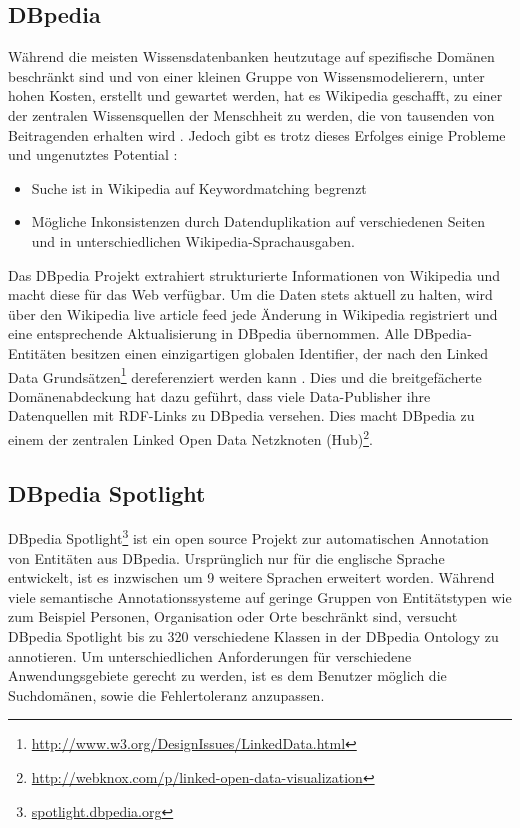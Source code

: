 \documentclass[11pt, a4paper, oneside]{Thesis} %
\begin{document}
\subsection{DBpedia}
W\"ahrend die meisten Wissensdatenbanken heutzutage auf spezifische Dom\"anen beschr\"ankt sind und von einer kleinen Gruppe von Wissensmodelierern, unter hohen Kosten, erstellt und gewartet werden, hat es Wikipedia geschafft, zu einer der zentralen Wissensquellen der Menschheit zu werden, die von tausenden von Beitragenden erhalten wird \citep{chr09}. Jedoch gibt es trotz dieses Erfolges einige Probleme und ungenutztes Potential \citep{moha12}:
\begin{itemize}
\item Suche ist in Wikipedia auf Keywordmatching begrenzt
\item M\"ogliche Inkonsistenzen durch Datenduplikation auf verschiedenen Seiten und in unterschiedlichen Wikipedia-Sprachausgaben.
\end{itemize}
Das DBpedia Projekt extrahiert strukturierte Informationen von Wikipedia und macht diese f\"ur das Web verf\"ugbar. Um die Daten stets aktuell zu halten, wird \"uber den \grqq Wikipedia live article feed\grqq{} jede \"Anderung in Wikipedia registriert und eine entsprechende Aktualisierung in DBpedia \"ubernommen. Alle DBpedia-Entit\"aten besitzen einen einzigartigen globalen Identifier, der nach den Linked Data Grunds\"atzen\footnote{\url{http://www.w3.org/DesignIssues/LinkedData.html}} dereferenziert werden kann \citep{chr09}. Dies und die breitgef\"acherte Dom\"anenabdeckung hat dazu gef\"uhrt, dass viele Data-Publisher ihre Datenquellen mit RDF-Links zu DBpedia versehen. Dies macht DBpedia zu einem der zentralen Linked Open Data Netzknoten (Hub)\footnote{\url{http://webknox.com/p/linked-open-data-visualization}}.

\subsection{DBpedia Spotlight}
DBpedia Spotlight\footnote{\url{spotlight.dbpedia.org}} ist ein open source Projekt zur automatischen Annotation von Entit\"aten aus DBpedia\citep{joch13}. Urspr\"unglich nur f\"ur die englische Sprache entwickelt, ist es inzwischen um 9 weitere Sprachen erweitert worden. W\"ahrend viele semantische Annotationssysteme auf geringe Gruppen von Entit\"atstypen wie zum Beispiel Personen, Organisation oder Orte beschr\"ankt sind, versucht DBpedia Spotlight bis zu 320 verschiedene Klassen in der DBpedia Ontology zu annotieren\citep{mend11}. Um unterschiedlichen Anforderungen f\"ur verschiedene Anwendungsgebiete gerecht zu werden, ist es dem Benutzer m\"oglich die Suchdom\"anen, sowie die Fehlertoleranz anzupassen.
\end{document}
